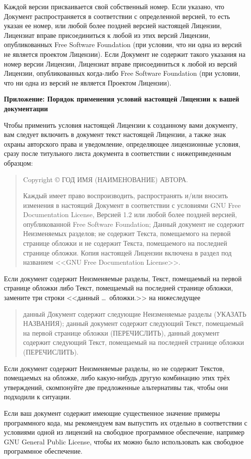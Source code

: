 Каждой версии присваивается свой собственный номер. Если указано, что
Документ распространяется в соответствии с определенной версией, то есть
указан ее номер, или любой более поздней версией настоящей Лицензии,
Лицензиат вправе присоединиться к любой из этих версий Лицензии,
опубликованных Free Software Foundation (при условии, что ни одна из
версий не является проектом Лицензии). Если Документ не содержит такого
указания на номер версии Лицензии, Лицензиат вправе присоединиться к
любой из версий Лицензии, опубликованных когда-либо Free Software
Foundation (при условии, что ни одна из версий не является Проектом
Лицензии).


\begin{center}
{\Large\bf Приложение: Порядок применения условий настоящей Лицензии к вашей документации\par}
\end{center}

Чтобы применить условия настоящей Лицензии к созданному вами документу,
вам следует включить в документ текст настоящей Лицензии, а также знак
охраны авторского права и уведомление, определяющее лицензионные условия,
сразу после титульного листа документа в соответствии с нижеприведенным
образцом:


\bigskip
\begin{quote}
    Copyright \copyright{}  ГОД  ИМЯ (НАИМЕНОВАНИЕ) АВТОРА.

    Каждый имеет право воспроизводить, распространять и/или вносить
    изменения в настоящий Документ в соответствии с условиями GNU Free
    Documentation License, Версией 1.2 или любой более поздней версией,
    опубликованной Free Software Foundation;
    Данный документ не содержит Неизменяемых разделов; не содержит Текста,
    помещаемого на первой странице обложки и не содержит Текста,
    помещаемого на последней странице обложки.
    Копия настоящей Лицензии включена в раздел под названием <<GNU Free
    Documentation License>>.
\end{quote}
\bigskip

Если документ содержит Неизменяемые разделы, Текст, помещаемый на первой
странице обложки либо Текст, помещаемый на последней странице обложки,
замените три строки <<данный \dots\ обложки.>> на нижеследущее

\bigskip
\begin{quote}
    данный Документ содержит следующие Неизменяемые разделы (УКАЗАТЬ НАЗВАНИЯ);
    данный документ содержит следующий Текст, помещаемый на первой странице
    обложки (ПЕРЕЧИСЛИТЬ), данный документ содержит следующий Текст,
    помещаемый на последней странице обложки (ПЕРЕЧИСЛИТЬ).
\end{quote}
\bigskip

Если документ содержит Неизменяемые разделы, но не содержит Текстов,
помещаемых на обложке, либо какую-нибудь другую комбинацию этих трёх
утверждений, скомпонуйте две предложенные альтернативы так, чтобы они
подходили к ситуации.

Если ваш документ содержит имеющие существенное значение примеры
программного кода, мы рекомендуем вам выпустить их отдельно в
соответствии с условиями одной из лицензий на свободное программное
обеспечение, например GNU General Public License, чтобы их можно было
использовать как свободное программное обеспечение.
